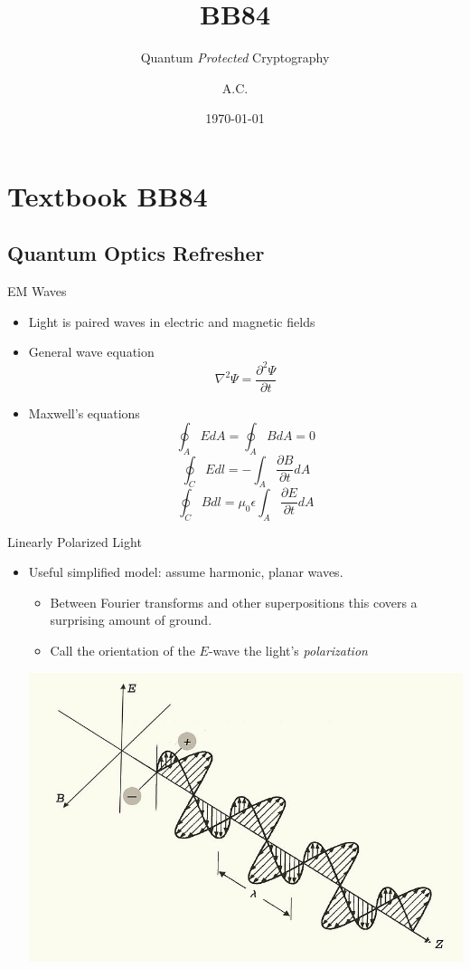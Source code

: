 \documentclass[pdf]{beamer}
\title{BB84}
\subtitle{Quantum \emph{Protected} Cryptography}
\author{A.C.}
\date{\today}
\begin{document}
\begin{frame}
  \titlepage
\end{frame}

\section{Textbook BB84}
\subsection{Quantum Optics Refresher}
\begin{frame}{EM Waves}
  \begin{itemize}
  \item Light is paired waves in electric and magnetic fields
  \pause\item General wave equation \[\nabla^2\Psi = \frac{\partial^2\Psi}{\partial t} \]
  \pause\item Maxwell's equations
    \[ \oint_A E dA = \oint_A B dA = 0 \]
    \[ \oint_C E dl = - \int_A \frac{\partial B}{\partial t} dA\]
    \[ \oint_C B dl = \mu_0 \epsilon \int_A \frac{\partial E}{\partial t} dA \]
  \end{itemize}
\end{frame}
\begin{frame}{Linearly Polarized Light}
  \begin{itemize}
  \item Useful simplified model: assume harmonic, planar waves.
    \begin{itemize}
    \item Between Fourier transforms and other superpositions this covers a
      surprising amount of ground.
    \item Call the orientation of the $E$-wave the light's \emph{polarization}
    \end{itemize}
    \begin{center}
      \includegraphics[scale=0.8]{images/light_wave.jpg}
    \end{center}
  \end{itemize}
\end{frame}
\end{document}
